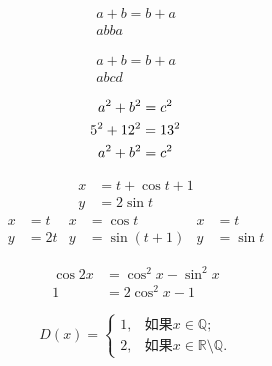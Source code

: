 \documentclass{ctexart}
\begin{document}
    \begin{gather}
        a + b = b + a  \\ 
        ab ba
    \end{gather}

    \begin{gather*}
        a+b = b+a \\
        ab cd
    \end{gather*}

    \begin{gather}
        a^2 + b^2 = c^2  \notag \\
        5^2 + 12^2 = 13^2 \notag \\
        a^2 + b^2 = c^2
    \end{gather}

    \begin{align}
        x & = t + \cos t + 1 \\
        y &= 2 \sin t
    \end{align}
    \begin{align*}
        x & = t & x & = \cos t & x & =t \\
        y & = 2t & y& =\sin(t+1) & y & = \sin t
    \end{align*}

    \begin{equation}
        \begin{split}
            \cos 2x & = \cos^2 x -\sin^2 x \\
           1 &= 2 \cos^2 x -1
        \end{split}
    \end{equation}

    \begin{equation}
    D(x) = \begin{cases}
        1, &\text{如果} x \in \mathbb{Q}; \\
        2, &\text{如果} x \in \mathbb{R}\setminus\mathbb{Q}.
    \end{cases}
    \end{equation}
    
\end{document}
